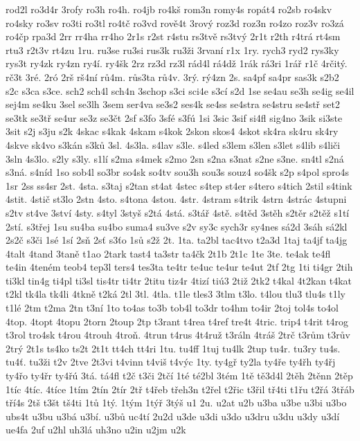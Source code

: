 {rod2l
ro3d4r
3rofy
ro3h
ro4h.
ro4jb
ro4kš
rom3n
romy4s
ropát4
ro2sb
ro4skv
ro4sky
ro3sv
ro3ti
ro3tl
ro4tč
ro3vd
rově4t
3rový
roz3d
roz3n
ro4zo
roz3v
ro3zá
ro4čp
rpa3d
2rr
rr4ha
rr4ho
2r1s
r2st
r4stu
rs3tvě
rs3tvý
2r1t
r2th
r4trá
rt4sm
rtu3
r2t3v
rt4zu
1ru.
ru3se
ru3si
rus3k
ru3ži
3rvaní
r1x
1ry.
rych3
ryd2
rys3ky
rys3t
ry4zk
ry4zn
ry4í.
ry4šk
2rz
rz3d
rz3l
rád4l
rá4dž
1rák
rá3ri
1rář
r1č
4rčitý.
rč3t
3ré.
2ró
2rš
rš4ní
rů4m.
růs3ta
rů4v.
3rý.
rý4zn
2s.
sa4pf
sa4pr
sas3k
s2b2
s2c
s3ca
s3ce.
sch2
sch4l
sch4n
3schop
s3ci
sci4e
s3cí
s2d
1se
se4au
se3h
se4ig
se4il
sej4m
se4ku
3sel
se3lh
3sem
ser4va
se3s2
ses4k
se4ss
se4stra
se4stru
se4stř
set2
se3tk
se3tř
se4ur
se3z
se3čt
2sf
s3fo
3sfé
s3fú
1si
3sic
3sif
si4fl
sig4no
3sik
si3ste
3sit
s2j
s3ju
s2k
4skac
s4kak
4skam
s4kok
2skon
skos4
4skot
sk4ra
sk4ru
sk4ry
4skve
sk4vo
s3kán
s3ků
3sl.
4s3la.
s4lav
s3le.
s4led
s3lem
s3len
s3let
s4lib
s4liči
3sln
4s3lo.
s2ly
s3ly.
s1lí
s2ma
s4mek
s2mo
2sn
s2na
s3nat
s2ne
s3ne.
sn4tl
s2ná
s3ná.
s4níd
1so
sob4l
so3br
so4sk
so4tv
sou3h
sou3s
souz4
so4šk
s2p
s4pol
spro4s
1sr
2ss
ss4sr
2st.
4sta.
s3taj
s2tan
st4at
4stec
s4tep
st4er
s4tero
s4tich
2stil
s4tink
4stit.
4stič
st3lo
2stn
4sto.
s4tona
4stou.
4str.
4stram
s4trik
4strn
4strác
4stupni
s2tv
st4ve
3ství
4sty.
s4tyl
3styš
s2tá
4stá.
s3tář
4stě.
s4těd
3stěh
s2těr
s2těž
s1tí
2stí.
s3třej
1su
su4ba
su4bo
suma4
su3ve
s2v
sy3c
sych3r
sy4nes
sá2d
3sáh
sá2kl
2s2č
s3či
1sé
1sí
2sň
2sť
s3ťo
1sů
s2ž
2t.
1ta.
ta2bl
tac4tvo
t2a3d
1taj
ta4jf
ta4jg
4talt
4tand
3taně
t1ao
2tark
tast4
ta3str
ta4čk
2t1b
2t1c
1te
3te.
te4ak
te4fl
te4in
4teném
teob4
tep3l
ters4
tes3ta
te4tr
te4uc
te4ur
te4ut
2tf
2tg
1ti
ti4gr
2tih
ti3kl
tin4g
ti4pl
ti3sl
tis4tr
ti4tr
2titu
tiz4r
4tizí
tiú3
2tiž
2tk2
t4kal
4t2kan
t4kat
t2kl
tk4la
tk4li
4tkně
t2ká
2tl
3tl.
4tla.
t1le
tles3
3tlm
t3lo.
t4lou
tlu3
tlu4s
t1ly
t1lé
2tm
t2ma
2tn
t3ní
1to
to4as
to3b
tob4l
to3dr
to4hm
to4ir
2toj
tol4s
to4ol
4top.
4topt
4topu
2torn
2toup
2tp
t3rant
t4rea
t4ref
tre4t
4tric.
trip4
t4rit
t4rog
t3rol
tro4sk
t4rou
4trouh
4troň.
4trun
t4rus
4t4ruž
t3ráln
4tráš
2trč
t3rům
t3rův
2trý
2t1s
ts4ko
ts2t
2t1t
tt4ch
tt4ri
1tu.
tu4ff
1tuj
tu4lk
2tup
tu4r.
tu3ry
tu4s.
tu4ť.
tu3ži
t2v
2tve
2t3vi
t4vinn
t4viš
t4výc
1ty.
ty4gř
ty2la
ty4ře
ty4řh
ty4řj
ty4řo
ty4řr
ty4řú
3tá.
tá4fl
t2č
t3či
2tčí
1té
té2bl
3tém
1tě
tě3d4l
2těh
2těnn
2těp
1tíc
4tíc.
4tíce
1tím
2tín
2tír
2tř
t4řeb
třeh3n
t2řel
t2řic
t3řil
tř4ti
t1řu
t2řá
3třáb
tří4s
2tš
t3št
tš4ti
1tů
1tý.
1tým
1týř
3týš
u1
2u.
u2at
u2b
u3ba
u3be
u3bi
u3bo
ubs4t
u3bu
u3bá
u3bí.
u3bů
uc4tí
2u2d
u3de
u3di
u3do
u3dru
u3du
u3dy
u3dí
ue4fa
2uf
u2hl
uh3lá
uh3no
u2in
u2jm
u2k
}
